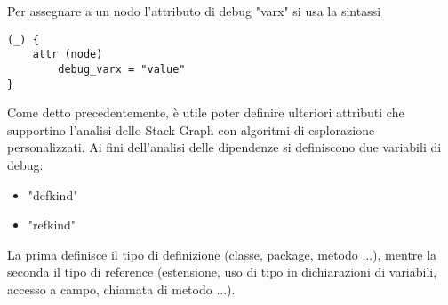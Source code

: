 Per assegnare a un nodo l'attributo di debug "varx" si usa la sintassi

\begin{lstlisting}
(_) {
    attr (node)
        debug_varx = "value"
}
\end{lstlisting}

Come detto precedentemente, \`e utile poter definire ulteriori attributi che supportino l'analisi dello Stack Graph con algoritmi di esplorazione personalizzati.
Ai fini dell'analisi delle dipendenze si definiscono due variabili di debug:

\begin{itemize}
    \item "defkind"
    \item "refkind"
\end{itemize}

La prima definisce il tipo di definizione (classe, package, metodo ...), mentre la seconda il tipo di reference (estensione, uso di tipo in dichiarazioni di variabili, accesso a campo, chiamata di metodo ...).
